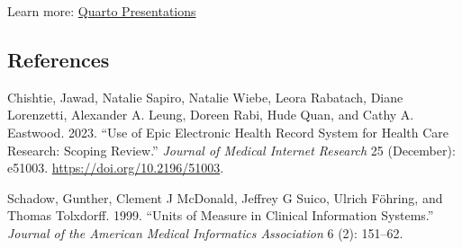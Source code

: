 \documentclass[
  letterpaper,
  DIV=11,
  numbers=noendperiod]{scrartcl}
\newlength{\cslhangindent}
\newenvironment{CSLReferences}[2] %
 {\begin{list}{}{%
  \setlength{\itemindent}{0pt}
  \setlength{\leftmargin}{0pt}
  \setlength{\parsep}{0pt}
  \ifodd #1
   \setlength{\leftmargin}{\cslhangindent}
   \setlength{\itemindent}{-1\cslhangindent}
  \fi
  \setlength{\itemsep}{#2\baselineskip}}}
 {\end{list}}
\begin{document}
Learn more:
\href{https://?meta:prerelease-subdomainquarto.org/docs/presentations/revealjs/}{Quarto
Presentations}

\subsection{References}\label{references}

\label{refs}
\begin{CSLReferences}{1}{0}
Chishtie, Jawad, Natalie Sapiro, Natalie Wiebe, Leora Rabatach, Diane
Lorenzetti, Alexander A. Leung, Doreen Rabi, Hude Quan, and Cathy A.
Eastwood. 2023. {``Use of {Epic Electronic Health Record System} for
{Health Care Research}: {Scoping Review}.''} \emph{Journal of Medical
Internet Research} 25 (December): e51003.
\url{https://doi.org/10.2196/51003}.

Schadow, Gunther, Clement J McDonald, Jeffrey G Suico, Ulrich Föhring,
and Thomas Tolxdorff. 1999. {``Units of Measure in Clinical Information
Systems.''} \emph{Journal of the American Medical Informatics
Association} 6 (2): 151--62.

\end{CSLReferences}
\end{document}
